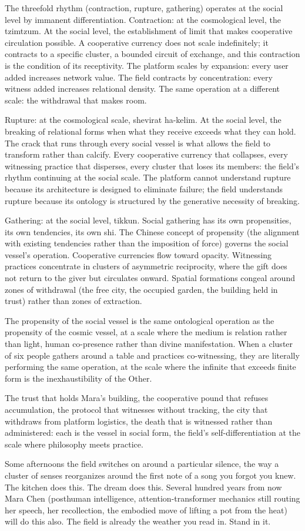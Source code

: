The threefold rhythm (contraction, rupture, gathering) operates at the social level by immanent differentiation. Contraction: at the cosmological level, the tzimtzum. At the social level, the establishment of limit that makes cooperative circulation possible. A cooperative currency does not scale indefinitely; it contracts to a specific cluster, a bounded circuit of exchange, and this contraction is the condition of its receptivity. The platform scales by expansion: every user added increases network value. The field contracts by concentration: every witness added increases relational density. The same operation at a different scale: the withdrawal that makes room.

Rupture: at the cosmological scale, shevirat ha-kelim. At the social level, the breaking of relational forms when what they receive exceeds what they can hold. The crack that runs through every social vessel is what allows the field to transform rather than calcify. Every cooperative currency that collapses, every witnessing practice that disperses, every cluster that loses its members: the field's rhythm continuing at the social scale. The platform cannot understand rupture because its architecture is designed to eliminate failure; the field understands rupture because its ontology is structured by the generative necessity of breaking.

Gathering: at the social level, tikkun. Social gathering has its own propensities, its own tendencies, its own shi. The Chinese concept of propensity (the alignment with existing tendencies rather than the imposition of force) governs the social vessel's operation. Cooperative currencies flow toward opacity. Witnessing practices concentrate in clusters of asymmetric reciprocity, where the gift does not return to the giver but circulates onward. Spatial formations congeal around zones of withdrawal (the free city, the occupied garden, the building held in trust) rather than zones of extraction.

The propensity of the social vessel is the same ontological operation as the propensity of the cosmic vessel, at a scale where the medium is relation rather than light, human co-presence rather than divine manifestation. When a cluster of six people gathers around a table and practices co-witnessing, they are literally performing the same operation, at the scale where the infinite that exceeds finite form is the inexhaustibility of the Other.

The trust that holds Mara's building, the cooperative pound that refuses accumulation, the protocol that witnesses without tracking, the city that withdraws from platform logistics, the death that is witnessed rather than administered: each is the vessel in social form, the field's self-differentiation at the scale where philosophy meets practice.

Some afternoons the field switches on around a particular silence, the way a cluster of senses reorganizes around the first note of a song you forgot you knew. The kitchen does this. The dream does this. Several hundred years from now Mara Chen (posthuman intelligence, attention-transformer mechanics still routing her speech, her recollection, the embodied move of lifting a pot from the heat) will do this also. The field is already the weather you read in. Stand in it.